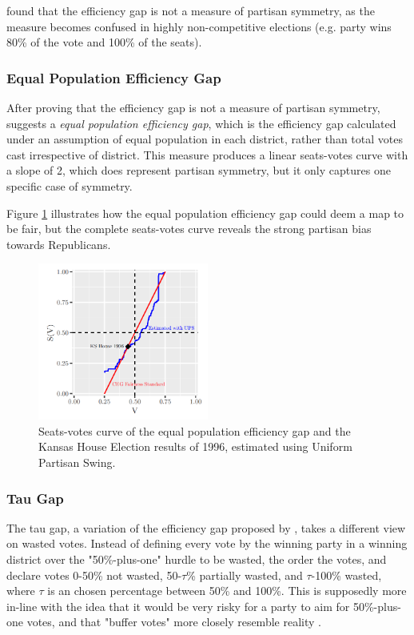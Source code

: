 \textcite{veomett2018} found that the efficiency gap is not a measure of partisan symmetry, as the measure becomes confused in highly non-competitive elections (e.g. party wins 80\% of the vote and 100\% of the seats). 

\subsubsection{Equal Population Efficiency Gap}

After proving that the efficiency gap is not a measure of partisan symmetry, \textcite{katz2020} suggests a \emph{equal population efficiency gap}, which is the efficiency gap calculated under an assumption of equal population in each district, rather than total votes cast irrespective of district. This measure produces a linear seats-votes curve with a slope of 2, which does represent partisan symmetry, but it only captures one specific case of symmetry. 

Figure \ref{fig:ceg} illustrates how the equal population efficiency gap could deem a map to be fair, but the complete seats-votes curve reveals the strong partisan bias towards Republicans. 

\begin{figure}
    \centering
    \includegraphics[width=0.5\textwidth]{img/ceg.sv.PNG}
    \caption{Seats-votes curve of the equal population efficiency gap and the Kansas House Election results of 1996, estimated using Uniform Partisan Swing.}
    \label{fig:ceg}
\end{figure}

\subsubsection{Tau Gap}
The tau gap, a variation of the efficiency gap proposed by \textcite{warrington2018}, takes a different view on wasted votes. Instead of defining every vote by the winning party in a winning district over the "50\%-plus-one" hurdle to be wasted, the order the votes, and declare votes 0-50\% not wasted, 50-$\tau$\% partially wasted, and $\tau$-100\% wasted, where $\tau$ is an chosen percentage between 50\% and 100\%. This is supposedly more in-line with the idea that it would be very risky for a party to aim for 50\%-plus-one votes, and that "buffer votes" more closely resemble reality \parencite{warrington2018}.

